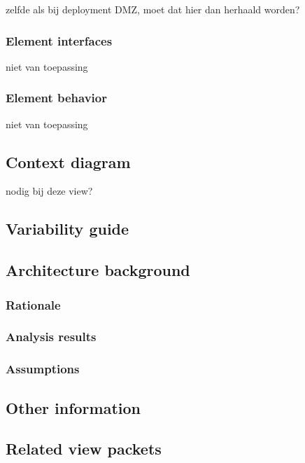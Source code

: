 \documentclass[a4paper,10pt]{book}
\begin{document}
zelfde als bij deployment DMZ, moet dat hier dan herhaald worden?

\subsubsection{Element interfaces}

niet van toepassing

\subsubsection{Element behavior}

niet van toepassing

\subsection{Context diagram}

nodig bij deze view?

\subsection{Variability guide}

\subsection{Architecture background}

\subsubsection{Rationale}



\subsubsection{Analysis results}

\subsubsection{Assumptions}

\subsection{Other information}

\subsection{Related view packets}
\end{document}
